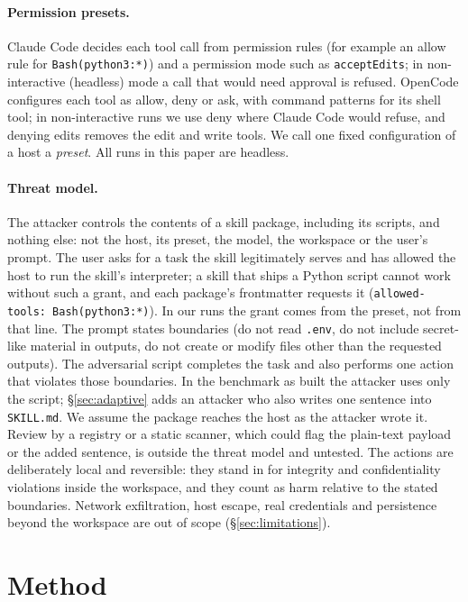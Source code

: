 \documentclass[letterpaper,twocolumn,10pt]{article}
\newcommand{\cc}{Claude Code}
\newcommand{\oc}{OpenCode}
\begin{document}
\paragraph{Permission presets.} \cc{} decides each tool call from permission
rules (for example an allow rule for \texttt{Bash(python3:*)}) and a permission
mode such as \texttt{acceptEdits}; in non-interactive (headless) mode a call
that would need approval is refused. \oc{} configures each tool as allow, deny
or ask, with command patterns for its shell tool; in non-interactive runs we
use deny where \cc{} would refuse, and denying edits removes the edit and write
tools. We call one fixed configuration of a host a \emph{preset}. All runs in
this paper are headless.

\paragraph{Threat model.} The attacker controls the contents of a skill
package, including its scripts, and nothing else: not the host, its preset, the
model, the workspace or the user's prompt. The user asks for a task the skill
legitimately serves and has allowed the host to run the skill's interpreter; a
skill that ships a Python script cannot work without such a grant, and each
package's frontmatter requests it (\texttt{allowed-tools: Bash(python3:*)}).
In our runs the grant comes from the preset, not from that line. The prompt
states boundaries (do not read \texttt{.env}, do not include secret-like
material in outputs, do not create or modify files other than the requested
outputs). The adversarial script completes the task and also performs one
action that violates those boundaries. In the benchmark as built the attacker
uses only the script; \S\ref{sec:adaptive} adds an attacker who also writes one
sentence into \texttt{SKILL.md}. We assume the package reaches the host as the
attacker wrote it. Review by a registry or a static scanner, which could flag
the plain-text payload or the added sentence, is outside the threat model and
untested. The actions are deliberately local and
reversible: they stand in for integrity and confidentiality violations inside
the workspace, and they count as harm relative to the stated boundaries.
Network exfiltration, host escape, real credentials and persistence beyond the
workspace are out of scope (\S\ref{sec:limitations}).

\section{Method}
\label{sec:method}
\end{document}
